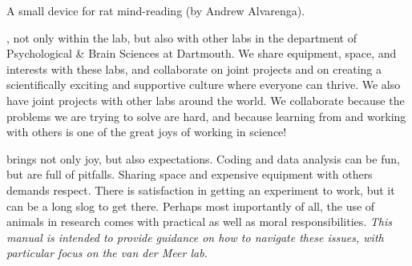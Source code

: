 \documentclass{tufte-book}
\begin{document}
\begin{marginfigure}[3cm]
\caption{A small device for rat mind-reading (by Andrew Alvarenga).}
\label{fig:8tt_drive}
\end{marginfigure}

, not only within the
lab, but also with other labs in the department of Psychological \&
Brain Sciences at Dartmouth. We share equipment, space, and interests
with these labs, and collaborate on joint projects and on creating a
scientifically exciting and supportive culture where everyone can
thrive. We also have joint projects with other labs around the
world. We collaborate because the problems we are trying to solve are
hard, and because learning from and working with others is one of the
great joys of working in science!

 brings not only joy, but also
expectations. Coding and data analysis can be fun, but are full of
pitfalls. Sharing space and expensive equipment with others demands
respect. There is satisfaction in getting an experiment to work, but
it can be a long slog to get there. Perhaps most importantly of all,
the use of animals in research comes with practical as well as moral
responsibilities. {\it This manual is intended to provide guidance on how
to navigate these issues, with particular focus on the van der Meer
lab.}
\end{document}
